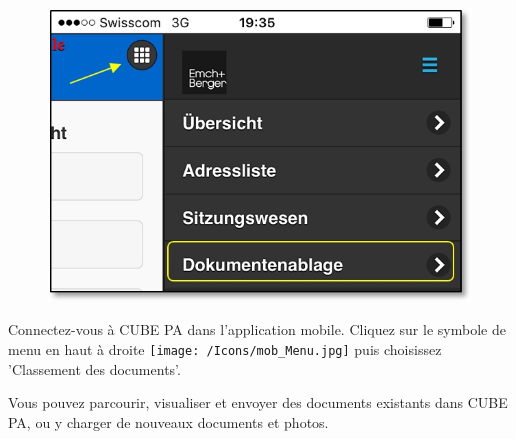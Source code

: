 \begin{figure}   %
  \vspace{-35pt}      %
  \begin{center}
    \includegraphics[width=1\linewidth]{../chapters/11_Dokumentenablage/pictures/11-mob01_Dokumentenablage_oeffnen.jpg}
  \end{center}
  \vspace{-20pt}
  \vspace{-10pt}
\end{figure}

Connectez-vous à CUBE PA dans l'application mobile. Cliquez sur le symbole de menu en haut à droite \texttt{[image: /Icons/mob\_Menu.jpg]} puis choisissez 'Classement des documents'.

\vspace{.5cm}

Vous pouvez parcourir, visualiser et envoyer des documents existants dans CUBE PA, ou y charger de nouveaux documents et photos.

\vspace{\baselineskip}

